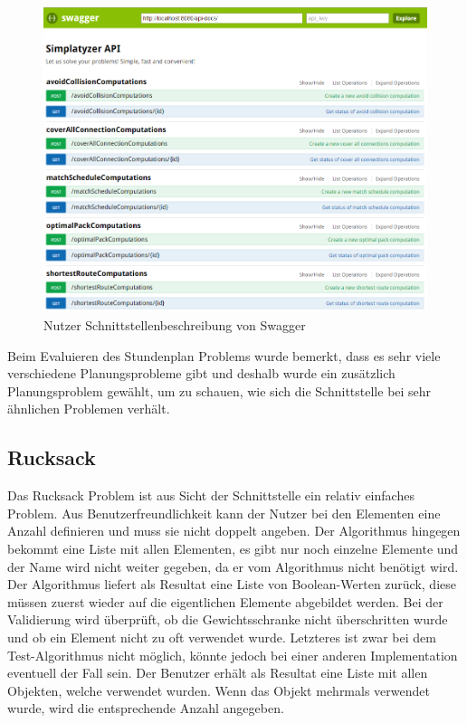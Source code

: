 \begin{figure}[h]
\centering
\includegraphics[scale=0.5]{images/swagger_api.png}
\caption[Nutzer Schnittstellenbeschreibung von Swagger]{Nutzer Schnittstellenbeschreibung von Swagger \selfmade{}}
\label{fig:swagger}
\end{figure}

\FloatBarrier

Beim Evaluieren des Stundenplan Problems wurde bemerkt, dass es sehr viele verschiedene Planungsprobleme gibt und deshalb wurde ein zusätzlich Planungsproblem gewählt, 
um zu schauen, wie sich die Schnittstelle bei sehr ähnlichen Problemen verhält.

%
%
%
%

\subsection{Rucksack}
Das Rucksack Problem ist aus Sicht der Schnittstelle ein relativ einfaches Problem. Aus Benutzerfreundlichkeit kann der Nutzer bei den Elementen eine Anzahl definieren und muss sie nicht 
doppelt angeben. Der Algorithmus hingegen bekommt eine Liste mit allen Elementen, es gibt nur noch einzelne Elemente und der Name wird nicht weiter gegeben, da er vom Algorithmus nicht 
benötigt wird. Der Algorithmus liefert als Resultat eine Liste von Boolean-Werten zurück, diese müssen zuerst wieder auf die eigentlichen Elemente abgebildet werden. Bei der Validierung wird 
überprüft, ob die Gewichtsschranke nicht überschritten wurde und ob ein Element nicht zu oft verwendet wurde. Letzteres ist zwar bei dem Test-Algorithmus nicht möglich, könnte jedoch bei 
einer anderen Implementation eventuell der Fall sein. Der Benutzer erhält als Resultat eine Liste mit allen Objekten, welche verwendet wurden. Wenn das Objekt mehrmals verwendet wurde, 
wird die entsprechende Anzahl angegeben.

